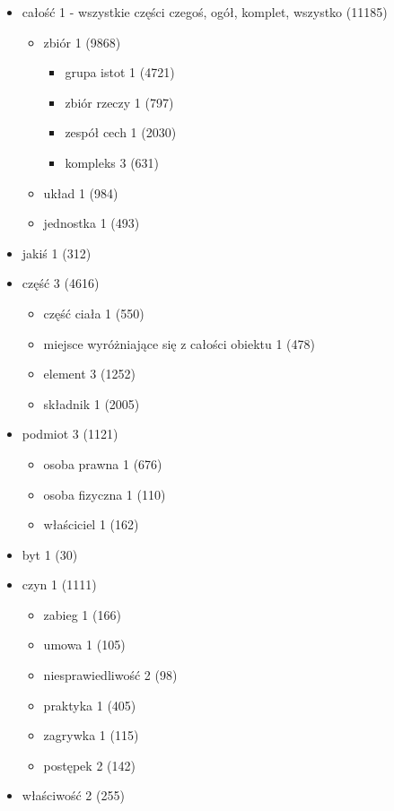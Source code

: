 \documentclass[a4paper,12pt]{article}
\begin{document}
\begin{itemize}
\begin{itemize}
\begin{itemize}
    \end{itemize}
  \end{itemize}
\item całość 1 - wszystkie części czegoś, ogół, komplet, wszystko (11185)
  \begin{itemize}
  \item zbiór 1 (9868)
    \begin{itemize}
    \item grupa istot 1 (4721)
    \item zbiór rzeczy 1 (797)
    \item zespół cech 1 (2030)
    \item kompleks 3 (631)
    \end{itemize}
  \item układ 1 (984)
  \item jednostka 1 (493)
  \end{itemize}
\item jakiś 1 (312) %
\item część 3 (4616)
  \begin{itemize}
  \item część ciała 1 (550)
  \item miejsce wyróżniające się z całości obiektu 1 (478)
  \item element 3 (1252)
  \item składnik 1 (2005)
  \end{itemize}
\item podmiot 3 (1121)
  \begin{itemize}
  \item osoba prawna 1 (676)
  \item osoba fizyczna 1 (110)
  \item właściciel 1 (162)
  \end{itemize}
\item byt 1 (30)
\item czyn 1  (1111)
  \begin{itemize}
  \item zabieg 1  (166)
  \item umowa 1  (105)
  \item niesprawiedliwość 2  (98)
  \item praktyka 1  (405)
  \item zagrywka 1  (115)
  \item postępek 2  (142)
  \end{itemize}
\item  właściwość 2 (255)
  \begin{itemize}

\end{itemize}
\end{itemize}
\end{document}
